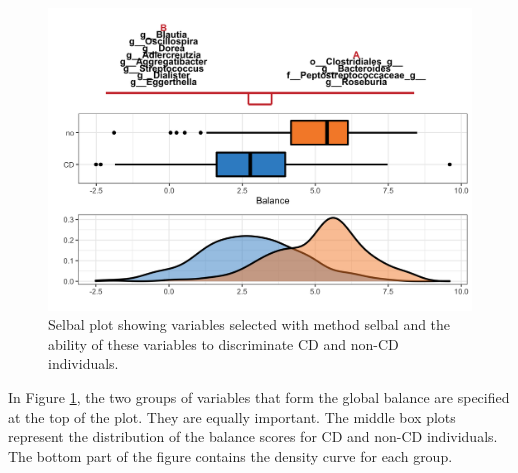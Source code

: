 \documentclass[openany]{book}
\newenvironment{Shaded}{\begin{snugshade}}{\end{snugshade}}
\newcommand{\KeywordTok}[1]{\textcolor[rgb]{0.13,0.29,0.53}{\textbf{#1}}}
\newcommand{\DataTypeTok}[1]{\textcolor[rgb]{0.13,0.29,0.53}{#1}}
\newcommand{\StringTok}[1]{\textcolor[rgb]{0.31,0.60,0.02}{#1}}
\newcommand{\CommentTok}[1]{\textcolor[rgb]{0.56,0.35,0.01}{\textit{#1}}}
\newcommand{\OtherTok}[1]{\textcolor[rgb]{0.56,0.35,0.01}{#1}}
\newcommand{\OperatorTok}[1]{\textcolor[rgb]{0.81,0.36,0.00}{\textbf{#1}}}
\newcommand{\NormalTok}[1]{#1}
\begin{document}
\begin{Shaded}
\end{Shaded}

\begin{figure}

{\centering \includegraphics[width=1\linewidth]{./Generated_plots/selbalCD-1} 

}

\caption{Selbal plot showing variables selected with method selbal and the ability of these variables to discriminate CD and non-CD individuals.}\label{fig:selbalCD}
\end{figure}

In Figure \ref{fig:selbalCD}, the two groups of variables that form the
global balance are specified at the top of the plot. They are equally
important. The middle box plots represent the distribution of the
balance scores for CD and non-CD individuals. The bottom part of the
figure contains the density curve for each group.
\end{document}
